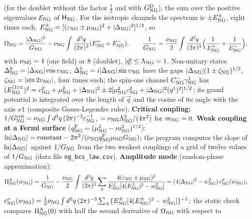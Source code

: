 \documentclass[
  10pt,
]{article}
\begin{document}
(for the doublet without the factor \(\tfrac12\) and with
\(G^{\rm D}_{\rm NG}\)), the sum over the positive eigenvalues
\(\mathcal E_{\rm NG}\) of \(\mathsf H_{\rm NG}\). For the isotropic
channels the spectrum is \(\pm E^\pm_{\rm NG}\), eight times each,
\(E^\pm_{\rm NG}=[(\varepsilon_{\rm NG}\pm\mu_{\rm NG})^2+\lvert\Delta_{\rm NG}\rvert^2]^{1/2}\),
so
\[\Omega_{\rm NG}=\frac{\lvert\Delta_{\rm NG}\rvert^2}{G_{\rm NG}}-\nu_{\rm NG}\int\frac{d^3q}{(2\pi)^3}(E^+_{\rm NG}+E^-_{\rm NG}),\qquad
\frac1{G_{\rm NG}}=\frac{\nu_{\rm NG}}2\int\frac{d^3q}{(2\pi)^3}\Big(\frac1{E^+_{\rm NG}}+\frac1{E^-_{\rm NG}}\Big),\]
with \(\nu_{\rm NG}=4\) (one field) or 8 (doublet),
\(\lvert\vec q\rvert\le\Lambda_{\rm NG}=1\). Non-unitary states
\(\Delta^0_{\rm NG}=\lvert\Delta_{\rm NG}\rvert\cos\upsilon_{\rm NG}\),
\(\Delta^5_{\rm NG}=i\lvert\Delta_{\rm NG}\rvert\sin\upsilon_{\rm NG}\)
have the gaps \(\lvert\Delta_{\rm NG}\rvert(1\pm\zeta_{\rm NG})^{1/2}\),
\(\zeta_{\rm NG}=\lvert\sin2\upsilon_{\rm NG}\rvert\), four times each;
the spin-one channel \(C^-_{\rm NG}\gamma^1_{\rm NG}\) has
\((E^{(1)\pm}_{\rm NG})^2=\varepsilon_{\rm NG}^2+\mu_{\rm NG}^2+\lvert\Delta_{\rm NG}\rvert^2\pm2[\mu_{\rm NG}^2\varepsilon_{\rm NG}^2+\lvert\Delta_{\rm NG}\rvert^2(q^1)^2]^{1/2}\);
its grand potential is integrated over the length of \(\vec q\) and the
cosine of its angle with the axis \(x1\) (composite Gauss-Legendre
rules). \textbf{Critical coupling:}
\(1/G^{\rm crit}_{\rm NG}=\nu_{\rm NG}\int d^3q\,(2\pi)^{-3}\varepsilon_{\rm NG}^{-1}\),
\(=\nu_{\rm NG}\Lambda_{\rm NG}^2/(4\pi^2)\) for \(m_{\rm NG}=0\).
\textbf{Weak coupling at a Fermi surface}
(\(q^{\rm F}_{\rm NG}=(\mu_{\rm NG}^2-m_{\rm NG}^2)^{1/2}\)):
\(\ln\lvert\Delta_{\rm NG}\rvert=\text{constant}-2\pi^2/(\nu_{\rm NG}q^{\rm F}_{\rm NG}\mu_{\rm NG}G_{\rm NG})\);
the program computes the slope of \(\ln\lvert\Delta_{\rm NG}\rvert\)
against \(1/G_{\rm NG}\) from the two weakest couplings of a grid of
twelve values of \(1/G_{\rm NG}\) (data file \texttt{ng\_bcs\_law.csv}).
\textbf{Amplitude mode} (random-phase approximation):
\[\Pi^{\rm A}_{\rm NG}(w_{\rm NG})=\frac1{G_{\rm NG}}-\frac{\nu_{\rm NG}}2\int\frac{d^3q}{(2\pi)^3}\sum_\pm\frac{4(\varepsilon_{\rm NG}\pm\mu_{\rm NG})^2}{E^\pm_{\rm NG}[4(E^\pm_{\rm NG})^2-w_{\rm NG}^2]}=(4\lvert\Delta_{\rm NG}\rvert^2-w_{\rm NG}^2)\,c^\sigma_{\rm NG}(w_{\rm NG}),\]
\(c^\sigma_{\rm NG}(w_{\rm NG})=\tfrac12\nu_{\rm NG}\int d^3q\,(2\pi)^{-3}\sum_\pm\{E^\pm_{\rm NG}[4(E^\pm_{\rm NG})^2-w_{\rm NG}^2]\}^{-1}\);
the static check compares \(\Pi^{\rm A}_{\rm NG}(0)\) with half the
second derivative of \(\Omega_{\rm NG}\) with respect to
\end{document}

